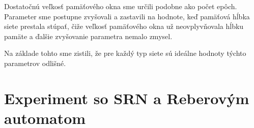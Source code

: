 Dostatočnú veľkosť pamäťového okna sme určili podobne ako počet epôch. Parameter sme postupne zvyšovali
a zastavili na hodnote, keď pamäťová hĺbka siete prestala stúpať, čiže veľkosť pamäťového okna už
neovplyvňovala hĺbku pamäte a ďalšie zvyšovanie parametra nemalo zmysel. 

Na základe tohto sme zistili, že pre každý typ siete sú ideálne hodnoty týchto parametrov odlišné.


\section{Experiment so SRN a Reberovým automatom}



